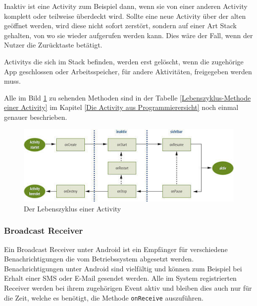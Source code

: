 Inaktiv ist eine Activity zum Beispiel dann, wenn sie von einer anderen Activity komplett oder teilweise \"uberdeckt wird. Sollte eine neue Activity \"uber der alten ge\"offnet werden, wird diese nicht sofort zerst\"ort, sondern auf einer Art Stack gehalten, von wo sie wieder aufgerufen werden kann. Dies w\"are der Fall, wenn der Nutzer die Zur\"ucktaste bet\"atigt.

Activitys die sich im Stack befinden, werden erst gel\"oscht, wenn die zugeh\"orige App geschlossen oder Arbeitsspeicher, f\"ur andere Aktivit\"aten, freigegeben werden muss. 

Alle im Bild \ref{ActivityLebenszyklus} zu sehenden Methoden sind in der Tabelle \ref{Lebenszyklus-Methode einer Activity} im Kapitel \ref{Die Activity aus Programmierersicht} noch einmal genauer beschrieben.

\begin{figure}[!ht]
\centering
\includegraphics[width=14cm]{Bilder/ActivityLifecycle}
\caption{Der Lebenszyklus einer Activity \cite{ActivityLifecycle}}
\label{ActivityLebenszyklus}
\centering
\end{figure}
\FloatBarrier


\subsubsection{Broadcast Receiver} \label{Broadcast Receiver aus Nutzersicht}
Ein Broadcast Receiver unter Android ist ein Empf\"anger f\"ur verschiedene Benachrichtigungen die vom Betriebssystem abgesetzt werden. Benachrichtigungen unter Android sind vielf\"altig und k\"onnen zum Beispiel bei Erhalt einer SMS oder E-Mail gesendet werden. Alle im System registrierten Receiver werden bei ihrem zugeh\"origen Event aktiv und bleiben dies auch nur f\"ur die Zeit, welche es ben\"otigt, die Methode \texttt{onReceive} auszuf\"uhren.

